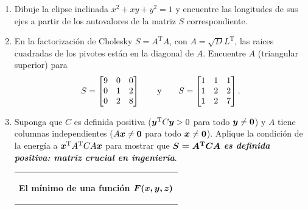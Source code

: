 \documentclass[12pt,a4paper]{article}
\newcommand{\bi}[1]{\hbox{\boldmath$#1$}}
\newcommand\1{\mbox{\,\vrule height-0.8pt depth1.0pt width2pc\,}}
\newcommand\2{\mbox{\,\vrule height-0.8pt depth1.0pt width1pc\,}}
\DeclareRobustCommand\transp{^{\mathrm{T}}}
\newcommand{\embf}[1]{\emph{\bfseries{#1}}}
\newcommand\OG{\qquad\hbox{y}\qquad}
\newcommand{\bm}{\mathbf}
\begin{document}
\begin{enumerate}
\[S=\begin{bmatrix} 10&6\\ 6&10\end{bmatrix}.
\]
\item Dibuje la elipse inclinada $x^2+xy+y^2=1$ y encuentre las longitudes de sus ejes a partir de los autovalores de la matriz $S$ correspondiente.
\item En la  factorización de Cholesky $S=A\transp A$, con  $A=\sqrt{D}L\transp$, las raices cuadradas de los pivotes están en la diagonal de $A$. Encuentre $A$ (triangular superior) para
%
\[
S=\begin{bmatrix} 9&0&0\\ 0&1&2\\ 0&2&8\end{bmatrix} \OG
S=\begin{bmatrix} 1&1&1\\ 1&2&2\\ 1&2&7\end{bmatrix}.
\]

\item Suponga que $C$ es definida positiva ($\bi y\transp C\bi y>0$ para todo $\bi y\neq \bm{0}$) y $A$ tiene columnas independientes ($A\bi x\neq\bm{0}$ para todo $\bi x\neq\bm{0}$). Aplique la condición de la energía a $\bi x\transp A\transp CA\bi x$ para mostrar que $\bi{S=A\transp CA}$\index[smbl]{$S=A\transp CA$} \embf{es definida positiva: matriz crucial en ingeniería}. %

\begin{tabular}{|@{\;}p{14.8cm}@{\;}|}\hline
\begin{center}
\vspace{-10pt}
\textbf{El mínimo de una función $\bi{F(x, y, z)}$}\index[indx]{Minimo@Mínimo}
\end{center}


\end{tabular}
\end{enumerate}
\end{document}
